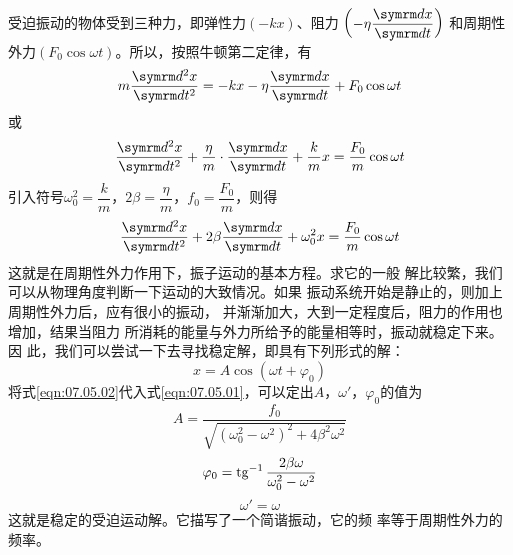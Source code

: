 受迫振动的物体受到三种力，即弹性力$ \left( - k x \right) $、阻力
$ \left( - \eta \dfrac { \dif x } { \dif t } \right) $
和周期性外力$ \left( F _ { 0 } \cos \omega t \right) $。所以，按照牛顿第二定律，有
\begin{equation*}
    m \frac { \dif ^ { 2 } x } { \dif t ^ { 2 } } = - k x - \eta \frac { \dif x } { \dif t } + F _ { 0 } \cos \omega t
\end{equation*}
或\vspace{-2em}
\begin{equation*}
    \frac { \dif ^ { 2 } x } { \dif t ^ { 2 } } + \frac { \eta } { m } \cdot \frac { \dif x } { \dif t } + \frac { k } { m } x = \frac { F _ { 0 } } { m } \cos \omega t
  \end{equation*}
引入符号$ \omega _ { 0 } ^ { 2 } = \dfrac { k } { m } $，$ 2 \beta = \dfrac { \eta } { m } $，$ f _ { 0 } = \dfrac { F _ { 0 } } { m } $，则得
\begin{equation}\label{eqn:07.05.01}
    \frac { \dif ^ { 2 } x } { \dif t ^ { 2 } } + 2 \beta \frac { \dif x } { \dif t } + \omega _ { 0 } ^ { 2 } x = \frac { F _ { 0 } } { m } \cos \omega t
\end{equation}
这就是在周期性外力作用下，振子运动的基本方程。求它的一般
解比较繁，我们可以从物理角度判断一下运动的大致情况。如果
振动系统开始是静止的，则加上周期性外力后，应有很小的振动，
并渐渐加大，大到一定程度后，阻力的作用也增加，结果当阻力
所消耗的能量与外力所给予的能量相等时，振动就稳定下来。因
此，我们可以尝试一下去寻找稳定解，即具有下列形式的解：
\begin{equation}\label{eqn:07.05.02}
    x = A \cos \left( \omega t + \varphi _ { 0 } \right)
\end{equation}
将式\eqref{eqn:07.05.02}代入式\eqref{eqn:07.05.01}，可以定出$ A $，$  \omega ' $，$ \varphi_{ 0 } $的值为
\begin{equation}\label{eqn:07.05.03}
    A = \frac { f _ { 0 } } { \sqrt { \left( \omega_{ 0 } ^ { 2 } - \omega ^ { 2 } \right) ^ { 2 } + 4 \beta ^ { 2 } \omega ^ { 2 } }}
\end{equation}\vspace{-0.5em}
\begin{equation}\label{eqn:07.05.04}
    \varphi _ { 0 } = \operatorname{tg} ^ { - 1 } \frac { 2 \beta \omega } { \omega_{ 0 } ^ { 2 } - \omega ^ { 2 } }
\end{equation}\vspace{-1em}
\begin{equation}\label{eqn:07.05.05}
    \omega ' = \omega
\end{equation}
这就是稳定的受迫运动解。它描写了一个简谐振动，它的频
率等于周期性外力的频率。

